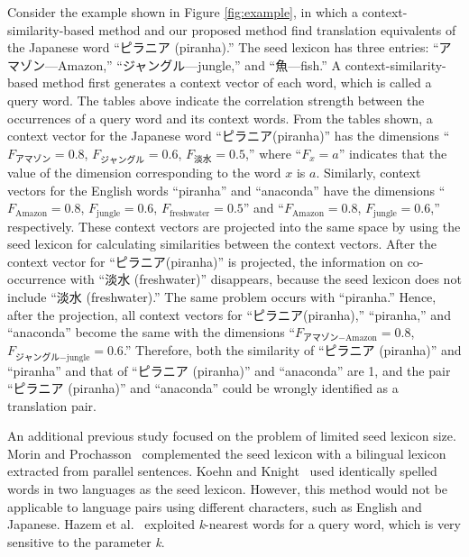 \documentclass[english]{jnlp_1.4}
\begin{document}
Consider the example shown in Figure \ref{fig:example}, in which a context-similarity-based method and our proposed method find translation equivalents of the Japanese word ``ピラニア (piranha).'' The seed lexicon has three entries: ``アマゾン---Amazon,'' ``ジャングル---jungle,'' and ``魚---fish.'' 
A context-similarity-based method first generates a context vector of each word, which is called a query word. 
The tables above indicate the correlation strength between the occurrences of a query word and its context words. 
From the tables shown, a context vector for the Japanese word ``ピラニア(piranha)'' has the dimensions ``$F_{アマゾン}=0.8$, $F_{ジャングル}=0.6$, $F_{淡水}=0.5$,'' where ``$F_{x}=a$'' indicates that the value of the dimension corresponding to the word $x$ is $a$. 
Similarly, context vectors for the English words ``piranha'' and ``anaconda'' have the dimensions ``$F_\mathrm{Amazon}=0.8$, $F_\mathrm{jungle}=0.6$, $F_\mathrm{freshwater}=0.5$'' and ``$F_\mathrm{Amazon}=0.8$, $F_\mathrm{jungle}=0.6$,'' respectively. 
These context vectors are projected into the same space by using the seed lexicon for calculating similarities between the context vectors. 
After the context vector for ``ピラニア(piranha)'' is projected, the information on co-occurrence with ``淡水 (freshwater)'' disappears, because the seed lexicon does not include ``淡水 (freshwater).'' 
The same problem occurs with ``piranha.'' 
Hence, after the projection, all context vectors for ``ピラニア(piranha),'' ``piranha,'' and ``anaconda'' become the same with the dimensions ``$F_{アマゾン\mathrm{-Amazon}}=0.8$, $F_{ジャングル\mathrm{-jungle}}=0.6$.'' 
Therefore, both the similarity of ``ピラニア (piranha)'' and ``piranha'' and that of ``ピラニア (piranha)'' and ``anaconda'' are 1, and the pair ``ピラニア (piranha)'' and ``anaconda'' could be wrongly identified as a translation pair. 

An additional previous study focused on the problem of limited seed lexicon size. 
Morin and Prochasson~\citeyear{morin11} complemented the seed lexicon with a bilingual lexicon extracted from parallel sentences. 
Koehn and Knight~\citeyear{koehn02} used identically spelled words in two languages as the seed lexicon. 
However, this method would not be applicable to language pairs using different characters, such as English and Japanese. 
Hazem et al.~\citeyear{hazem11} exploited \textit{k}-nearest words for a query word, which is very sensitive to the parameter \textit{k}. 
\end{document}
